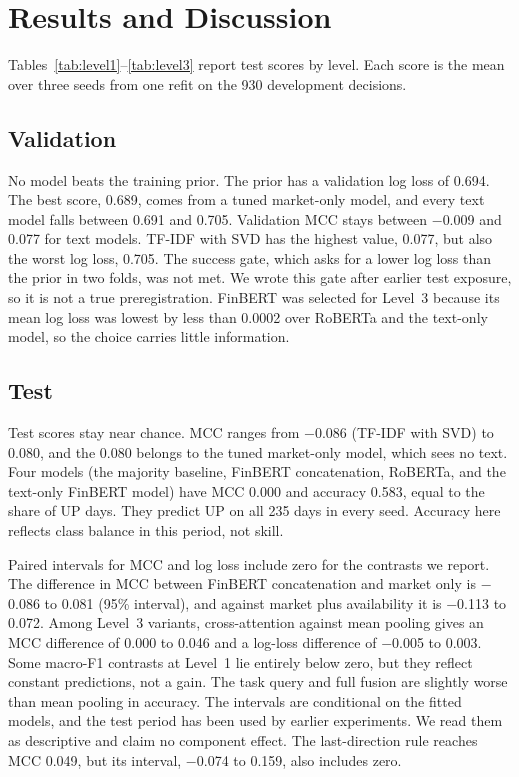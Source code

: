 \section{Results and Discussion}
\label{sec:results}
Tables~\ref{tab:level1}--\ref{tab:level3} report test scores by level. Each score is the mean over three seeds from one refit on the 930 development decisions.



\subsection{Validation}
No model beats the training prior. The prior has a validation log loss of 0.694. The best score, 0.689, comes from a tuned market-only model, and every text model falls between 0.691 and 0.705. Validation MCC stays between $-$0.009 and 0.077 for text models. TF-IDF with SVD has the highest value, 0.077, but also the worst log loss, 0.705. The success gate, which asks for a lower log loss than the prior in two folds, was not met. We wrote this gate after earlier test exposure, so it is not a true preregistration. FinBERT was selected for Level~3 because its mean log loss was lowest by less than 0.0002 over RoBERTa and the text-only model, so the choice carries little information.

\subsection{Test}
Test scores stay near chance. MCC ranges from $-$0.086 (TF-IDF with SVD) to 0.080, and the 0.080 belongs to the tuned market-only model, which sees no text. Four models (the majority baseline, FinBERT concatenation, RoBERTa, and the text-only FinBERT model) have MCC 0.000 and accuracy 0.583, equal to the share of UP days. They predict UP on all 235 days in every seed. Accuracy here reflects class balance in this period, not skill.

Paired intervals for MCC and log loss include zero for the contrasts we report. The difference in MCC between FinBERT concatenation and market only is $-$0.086 to 0.081 (95\% interval), and against market plus availability it is $-$0.113 to 0.072. Among Level~3 variants, cross-attention against mean pooling gives an MCC difference of 0.000 to 0.046 and a log-loss difference of $-$0.005 to 0.003. Some macro-F1 contrasts at Level~1 lie entirely below zero, but they reflect constant predictions, not a gain. The task query and full fusion are slightly worse than mean pooling in accuracy. The intervals are conditional on the fitted models, and the test period has been used by earlier experiments. We read them as descriptive and claim no component effect. The last-direction rule reaches MCC 0.049, but its interval, $-$0.074 to 0.159, also includes zero.

